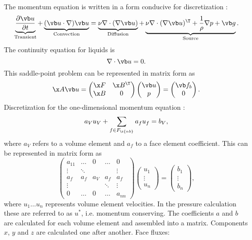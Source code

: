 \documentclass[12pt]{article}
\newcommand{\fnb}{F_{\x{nb}}}
\begin{document}
The momentum equation is written in a form conducive for discretization \cite{mou}:
$$
  \underbrace{\frac{\partial \vb u}{\partial t}}_\text{Transient} + \underbrace{(\vb u \cdot \nabla) \vb u}_\text{Convection} = \underbrace{\nu \nabla \cdot (\nabla \vb u)}_\text{Diffusion} + \underbrace{\nu \nabla \cdot (\nabla \vb u)^\T + \frac{1}{\rho} \nabla p + \vb g}_\text{Source}.
$$
The continuity equation for liquids is
$$
\nabla \cdot \vb u = 0.
$$
This saddle-point problem can be represented in matrix form as \cite{mou}
$$
\x A \vb u = \begin{pmatrix}
  \x F & \x B^\T \\
  \x B & 0
\end{pmatrix}
\begin{pmatrix}
  \vb u \\
  p
\end{pmatrix} =
\begin{pmatrix}
  \vb f_b \\
  0
\end{pmatrix}.
$$
Discretization for the one-dimensional momentum equation \cite{mou}:
\begin{equation}
  a_V u_V + \sum_{f \in \fnb} a_f u_f = b_V,
\end{equation}
where $a_V$ refers to a volume element and $a_f$ to a face element coefficient. This can be represented in matrix form as
$$
\begin{pmatrix}
  a_{11} & \dots & 0 & \dots & 0 \\
  \vdots & \ddots & &  & \vdots \\
  a_f & a_f & a_V & a_f & a_f \\
  \vdots & &  & \ddots & \vdots \\
  0 & \dots & 0 & \dots & a_{nn}
\end{pmatrix}
\begin{pmatrix}
  u_1 \\
  \vdots \\
  u_n
\end{pmatrix} =
\begin{pmatrix}
  b_{1} \\
  \vdots \\
  b_n
\end{pmatrix},
$$
where $u_1 \dots u_n$ represents volume element velocities. In the pressure calculation these are referred to as $u^*$, i.e. momentum conserving. The coefficients $a$ and $b$ are calculated for each volume element and assembled into a matrix. Components $x$, $y$ and $z$ are calculated one after another.
Face fluxes:
\end{document}
